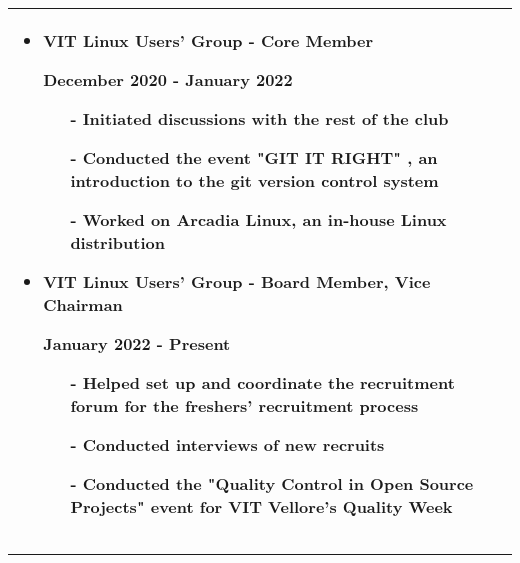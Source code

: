 \documentclass[12pt]{article}
\newcommand{\primarycolor}{red}
\newcommand{\mysection}[1]{{\large\color{\primarycolor}{#1}}}
\begin{document}
\begin{tabularx}{\textwidth}{p{0.4\hsize}|X}
\begin{itemize}[itemsep=1.5ex,leftmargin=1ex]
\begin{itemize}[itemsep=3ex, leftmargin=0.1ex]
                \item\textbf{VIT Linux Users' Group - Core Member}

                {\color{\primarycolor}December 2020 - January 2022}
                \begin{itemize}[itemsep=1ex, leftmargin=3.5ex]
                    \item[-] Initiated discussions with the rest of the club
                    \item[-] Conducted the event "GIT IT RIGHT" , an introduction to the git version control system
                    \item[-] Worked on Arcadia Linux, an in-house Linux distribution
                \end{itemize}

                \item\textbf{VIT Linux Users' Group - Board Member, Vice Chairman}

                {\color{\primarycolor}January 2022 - Present}
                \begin{itemize}[itemsep=1ex, leftmargin=3.5ex]
                    \item[-] Helped set up and coordinate the recruitment forum for the freshers' recruitment process
                    \item[-] Conducted interviews of new recruits
                    \item[-] Conducted the "Quality Control in Open Source Projects" event for VIT Vellore's Quality Week
                \end{itemize}
            \end{itemize}
        \end{itemize} \\

        \hline
    \end{tabularx}

    \clearpage
    \vspace{1ex}
    \hrule
    \vspace{2ex}
    \noindent\mysection{Projects}
\end{document}
